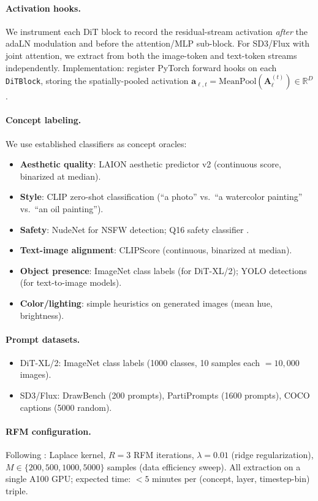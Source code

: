 \documentclass[11pt]{article}
\newcommand{\R}{\mathbb{R}}
\newcommand{\ba}{\mathbf{a}}
\newcommand{\bA}{\mathbf{A}}
\begin{document}
\paragraph{Activation hooks.}
We instrument each DiT block to record the residual-stream activation \emph{after} the adaLN modulation and before the attention/MLP sub-block.
For SD3/Flux with joint attention, we extract from both the image-token and text-token streams independently.
Implementation: register PyTorch forward hooks on each \texttt{DiTBlock}, storing the spatially-pooled activation $\ba_{\ell,t} = \mathrm{MeanPool}(\bA_\ell^{(t)}) \in \R^D$.

\paragraph{Concept labeling.}
We use established classifiers as concept oracles:
\begin{itemize}[leftmargin=*]
    \item \textbf{Aesthetic quality}: LAION aesthetic predictor v2 (continuous score, binarized at median).
    \item \textbf{Style}: CLIP zero-shot classification (``a photo'' vs.\ ``a watercolor painting'' vs.\ ``an oil painting'').
    \item \textbf{Safety}: NudeNet for NSFW detection; Q16 safety classifier \citep{schramowski2022safe}.
    \item \textbf{Text-image alignment}: CLIPScore (continuous, binarized at median).
    \item \textbf{Object presence}: ImageNet class labels (for DiT-XL/2); YOLO detections (for text-to-image models).
    \item \textbf{Color/lighting}: simple heuristics on generated images (mean hue, brightness).
\end{itemize}

\paragraph{Prompt datasets.}
\begin{itemize}[leftmargin=*]
    \item DiT-XL/2: ImageNet class labels (1000 classes, 10 samples each $= 10{,}000$ images).
    \item SD3/Flux: DrawBench (200 prompts), PartiPrompts (1600 prompts), COCO captions (5000 random).
\end{itemize}

\paragraph{RFM configuration.}
Following \citet{beaglehole2026universal}: Laplace kernel, $R = 3$ RFM iterations, $\lambda = 0.01$ (ridge regularization), $M \in \{200, 500, 1000, 5000\}$ samples (data efficiency sweep).
All extraction on a single A100 GPU; expected time: $< 5$ minutes per (concept, layer, timestep-bin) triple.
\end{document}
